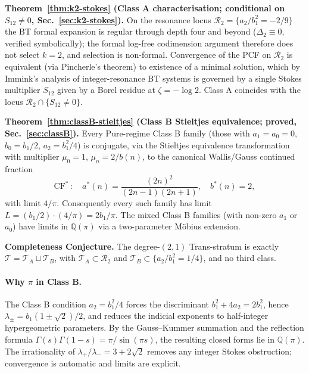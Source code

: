 \documentclass[11pt,a4paper]{article}
\theoremstyle{definition}
\begin{document}
\medskip
\noindent\textbf{Theorem~\ref{thm:k2-stokes} (Class A characterisation; conditional on $S_{12}\ne 0$, Sec.~\ref{sec:k2-stokes}).}
On the resonance locus $\mathcal{R}_2 = \{a_2/b_1^2 = -2/9\}$ the BT formal expansion is regular through depth four and beyond ($\Delta_2 \equiv 0$, verified symbolically); the formal log-free codimension argument therefore does not select $k=2$, and selection is non-formal. Convergence of the PCF on $\mathcal{R}_2$ is equivalent (via Pincherle's theorem) to existence of a minimal solution, which by Immink's analysis of integer-resonance BT systems \cite{immink1984} is governed by a single Stokes multiplier $S_{12}$ given by a Borel residue at $\zeta = -\log 2$. Class A coincides with the locus $\mathcal{R}_2 \cap \{S_{12}\ne 0\}$.

\medskip
\noindent\textbf{Theorem~\ref{thm:classB-stieltjes} (Class B Stieltjes equivalence; proved, Sec.~\ref{sec:classB}).}
Every Pure-regime Class B family (those with $a_1 = a_0 = 0$, $b_0 = b_1/2$, $a_2 = b_1^2/4$) is conjugate, via the Stieltjes equivalence transformation with multiplier $\mu_0 = 1$, $\mu_n = 2/b(n)$, to the canonical Wallis/Gauss continued fraction
\begin{equation}\label{eq:wallis-canonical}
  \mathrm{CF}^*\,:\quad a^*(n)=\frac{(2n)^2}{(2n-1)(2n+1)},\quad b^*(n) = 2,
\end{equation}
with limit $4/\pi$. Consequently every such family has limit $L = (b_1/2)\cdot(4/\pi) = 2b_1/\pi$. The mixed Class B families (with non-zero $a_1$ or $a_0$) have limits in $\mathbb{Q}(\pi)$ via a two-parameter Möbius extension.

\medskip
\noindent\textbf{Completeness Conjecture.}
The degree-$(2,1)$ Trans-stratum is exactly $\mathcal{T} = \mathcal{T}_A \sqcup \mathcal{T}_B$, with $\mathcal{T}_A \subset \mathcal{R}_2$ and $\mathcal{T}_B \subset \{a_2/b_1^2 = 1/4\}$, and no third class.

\paragraph{Why $\pi$ in Class B.}
The Class B condition $a_2 = b_1^2/4$ forces the discriminant $b_1^2 + 4a_2 = 2b_1^2$, hence $\lambda_\pm = b_1(1\pm\sqrt{2})/2$, and reduces the indicial exponents to half-integer hypergeometric parameters. By the Gauss--Kummer summation \cite[\S 13]{andrews-askey-roy} and the reflection formula $\Gamma(s)\Gamma(1-s) = \pi/\sin(\pi s)$, the resulting closed forms lie in $\mathbb{Q}(\pi)$. The irrationality of $\lambda_+/\lambda_- = 3+2\sqrt{2}$ removes any integer Stokes obstruction; convergence is automatic and limits are explicit.
\end{document}
